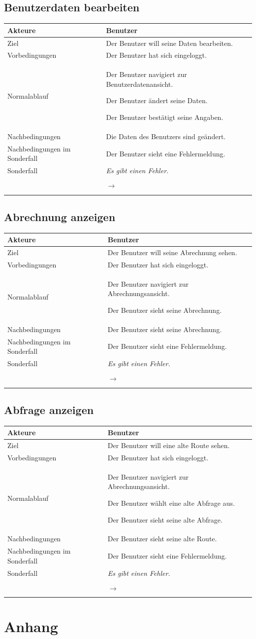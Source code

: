 \documentclass[a4paper,10pt,titlepage]{article}
\makeatletter
\newcommand\novspace{\@minipagetrue}
\newenvironment{owncompactitem}{%
\compactitem
}{%
\@finalstrut\@arstrutbox
\@nameuse{endcompactitem}%
\aftergroup\let\aftergroup\@finalstrut\aftergroup\@gobble
}
\newenvironment{owncompactenum}{%
\compactenum
}{%
\@finalstrut\@arstrutbox
\@nameuse{endcompactenum}%
\aftergroup\let\aftergroup\@finalstrut\aftergroup\@gobble
}
\newcommand{\usecase}[7]
{\subsection{#1}
\setlength{\extrarowheight}{2pt}
\begin{tabular}{|p{0.2\textwidth}|p{0.9\textwidth}|}
\hline
  Akteure & #2\\\hline
  Ziel & #3\\\hline
  Vorbedingungen & \novspace
  	\begin{owncompactitem}[-] #4 \end{owncompactitem} \\\hline
  Normalablauf & \vspace{-7pt}
  	\begin{owncompactenum}[1.] #6 \end{owncompactenum} \\\hline
  Nachbedingungen & \novspace
  	\begin{owncompactitem}[-] #5 \end{owncompactitem} \\\hline
  #7
\end{tabular}
}
\newcommand{\kurzersonderfall}[3][\empty]
{
Sonderfall #2 & \vspace{-10pt}
	\textit{#3}
  	\ifthenelse{\equal{#1}{\empty}}
    	{\\\hline} %
    	{\\&\ensuremath{\rightarrow} #1 \\ [+1pt] \hline} %

}
\newcommand{\sondernachbedingung}[1]
{
Nachbedingungen im Sonderfall& \novspace
	\begin{owncompactitem}[-]
		#1
	\end{owncompactitem} \\\hline
}
\makeatother
\begin{document}
\usecase{Benutzerdaten bearbeiten}{Benutzer}%
{%
Der Benutzer will seine Daten bearbeiten.
}{%
	\item Der Benutzer hat sich eingeloggt.
}{%
	\item Die Daten des Benutzers sind geändert.
}{%
	\item Der Benutzer navigiert zur Benutzerdatenansicht.
	\item Der Benutzer ändert seine Daten.
	\item Der Benutzer bestätigt seine Angaben.
}{%
\sondernachbedingung{
	\item Der Benutzer sieht eine Fehlermeldung.
	}
\kurzersonderfall[]{}%
	{%
	Es gibt einen Fehler.
	}
}

\usecase{Abrechnung anzeigen}{Benutzer}%
{%
Der Benutzer will seine Abrechnung sehen.
}{%
	\item Der Benutzer hat sich eingeloggt.
}{%
	\item Der Benutzer sieht seine Abrechnung.
}{%
	\item Der Benutzer navigiert zur Abrechnungsansicht.
	\item Der Benutzer sieht seine Abrechnung.
}{%
\sondernachbedingung{
	\item Der Benutzer sieht eine Fehlermeldung.
	}
\kurzersonderfall[]{}%
	{%
	Es gibt einen Fehler.
	}
}

\usecase{Abfrage anzeigen}{Benutzer}%
{%
Der Benutzer will eine alte Route sehen.
}{%
	\item Der Benutzer hat sich eingeloggt.
}{%
	\item Der Benutzer sieht seine alte Route.
}{%
	\item Der Benutzer navigiert zur Abrechnungsansicht.
	\item Der Benutzer wählt eine alte Abfrage aus.
	\item Der Benutzer sieht seine alte Abfrage.
}{%
\sondernachbedingung{
	\item Der Benutzer sieht eine Fehlermeldung.
	}
\kurzersonderfall[]{}%
	{%
	Es gibt einen Fehler.
	}
}

\clearpage
\appendix
\section{Anhang}
\end{document}
